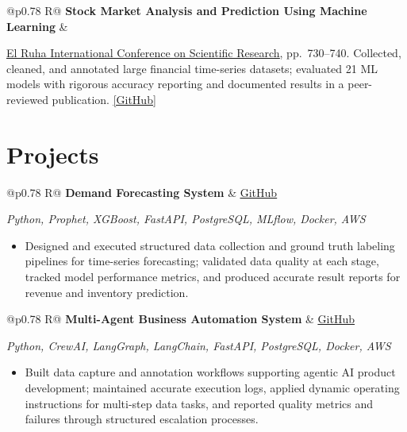 \documentclass[a4paper,10pt]{article}
\newcommand{\ulink}[2]{\href{#1}{\uline{#2}}}
\newcommand{\subheading}[1]{{\color[HTML]{0A0A0A}\fontsize{12}{14}\selectfont\bfseries #1}}
\newcommand{\techstack}[1]{{\color[HTML]{5C5C5C}\fontsize{10.5}{12.5}\selectfont\itshape #1}}
\newcommand{\meta}[1]{{\color[HTML]{5C5C5C}\fontsize{10.5}{12.5}\selectfont #1}}
\begin{document}
\begin{tabularx}{\linewidth}{@{}p{0.78\linewidth} R@{}}
\subheading{Stock Market Analysis and Prediction Using Machine Learning} & \meta{2025}
\end{tabularx}
\vspace{1pt}
{\color[HTML]{0A0A0A}\fontsize{11}{14}\selectfont
\ulink{https://www.elruha.org/_files/ugd/614b1f_6b95e1b697bf452b9907ba46e0151c05.pdf\#page=774}{El Ruha International Conference on Scientific Research}, pp.\ 730--740. Collected, cleaned, and annotated large financial time-series datasets; evaluated 21 ML models with rigorous accuracy reporting and documented results in a peer-reviewed publication. \ulink{https://github.com/su-jin1425/Set-Project}{[GitHub]}}

\vspace{2pt}

\section{Projects}
\vspace{2pt}

\begin{tabularx}{\linewidth}{@{}p{0.78\linewidth} R@{}}
\subheading{Demand Forecasting System} & \meta{\ulink{https://github.com/su-jin1425/Demand-Forecasting-System}{GitHub}}
\end{tabularx}
\vspace{1pt}
\techstack{Python, Prophet, XGBoost, FastAPI, PostgreSQL, MLflow, Docker, AWS}
\begin{itemize}[nosep, leftmargin=1.5em, itemsep=1pt, topsep=2pt]
\item {\color[HTML]{0A0A0A}\fontsize{11}{14}\selectfont
Designed and executed structured data collection and ground truth labeling pipelines for time-series forecasting; validated data quality at each stage, tracked model performance metrics, and produced accurate result reports for revenue and inventory prediction.}
\end{itemize}

\vspace{2pt}

\begin{tabularx}{\linewidth}{@{}p{0.78\linewidth} R@{}}
\subheading{Multi-Agent Business Automation System} & \meta{\ulink{https://github.com/su-jin1425/Multi-Agent-Business-Automation}{GitHub}}
\end{tabularx}
\vspace{1pt}
\techstack{Python, CrewAI, LangGraph, LangChain, FastAPI, PostgreSQL, Docker, AWS}
\begin{itemize}[nosep, leftmargin=1.5em, itemsep=1pt, topsep=2pt]
\item {\color[HTML]{0A0A0A}\fontsize{11}{14}\selectfont
Built data capture and annotation workflows supporting agentic AI product development; maintained accurate execution logs, applied dynamic operating instructions for multi-step data tasks, and reported quality metrics and failures through structured escalation processes.}
\end{itemize}
\end{document}

